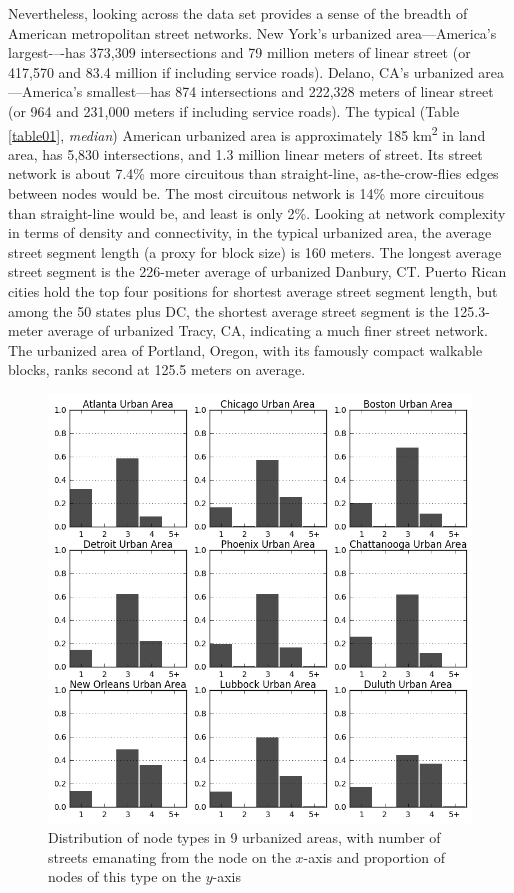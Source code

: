 \documentclass{article}
\begin{document}
Nevertheless, looking across the data set provides a sense of the breadth of American metropolitan street networks. New York's urbanized area---America's largest-–-has 373,309 intersections and 79 million meters of linear street (or 417,570 and 83.4 million if including service roads). Delano, CA's urbanized area---America's smallest---has 874 intersections and 222,328 meters of linear street (or 964 and 231,000 meters if including service roads). The typical (Table \ref{table01}, \emph{median}) American urbanized area is approximately 185 km\textsuperscript{2} in land area, has 5,830 intersections, and 1.3 million linear meters of street. Its street network is about 7.4\% more circuitous than straight-line, as-the-crow-flies edges between nodes would be. The most circuitous network is 14\% more circuitous than straight-line would be, and least is only 2\%. Looking at network complexity in terms of density and connectivity, in the typical urbanized area, the average street segment length (a proxy for block size) is 160 meters. The longest average street segment is the 226-meter average of urbanized Danbury, CT. Puerto Rican cities hold the top four positions for shortest average street segment length, but among the 50 states plus DC, the shortest average street segment is the 125.3-meter average of urbanized Tracy, CA, indicating a much finer street network. The urbanized area of Portland, Oregon, with its famously compact walkable blocks, ranks second at 125.5 meters on average.

\begin{figure}[hp]
\includegraphics[width=1\textwidth]{media/fig02.png}
\caption{Distribution of node types in 9 urbanized areas, with number of streets emanating from the node on the $x$-axis and proportion of nodes of this type on the $y$-axis }
\label{fig02}
\end{figure}
\end{document}

